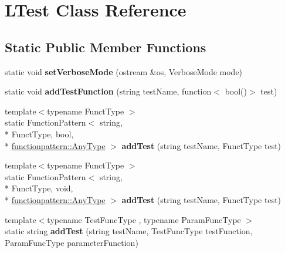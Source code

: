 \hypertarget{class_l_test}{\section{L\-Test Class Reference}
\label{class_l_test}
}
\subsection*{Static Public Member Functions}
\begin{DoxyCompactItemize}
\item 
\hypertarget{class_l_test_af5b3eae6c08705345a7b62f42e500af6}{static void {\bfseries set\-Verbose\-Mode} (ostream \&os, Verbose\-Mode mode)}\label{class_l_test_af5b3eae6c08705345a7b62f42e500af6}

\item 
\hypertarget{class_l_test_acec66e13084163dc332fa8625fea15ad}{static void {\bfseries add\-Test\-Function} (string test\-Name, function$<$ bool()$>$ test)}\label{class_l_test_acec66e13084163dc332fa8625fea15ad}

\item 
\hypertarget{class_l_test_ab407d3a24f5cb9736b892bcaf7063a3c}{{\footnotesize template$<$typename Funct\-Type $>$ }\\static Function\-Pattern$<$ string, \\*
Funct\-Type, bool, \\*
\hyperlink{structfunctionpattern_1_1_any_type}{functionpattern\-::\-Any\-Type} $>$ {\bfseries add\-Test} (string test\-Name, Funct\-Type test)}\label{class_l_test_ab407d3a24f5cb9736b892bcaf7063a3c}

\item 
\hypertarget{class_l_test_a99285262a01ef68ca4c6e1c1f3c558a3}{{\footnotesize template$<$typename Funct\-Type $>$ }\\static Function\-Pattern$<$ string, \\*
Funct\-Type, void, \\*
\hyperlink{structfunctionpattern_1_1_any_type}{functionpattern\-::\-Any\-Type} $>$ {\bfseries add\-Test} (string test\-Name, Funct\-Type test)}\label{class_l_test_a99285262a01ef68ca4c6e1c1f3c558a3}

\item 
\hypertarget{class_l_test_a414d784ce0ba99b010ab97bc34a7d762}{{\footnotesize template$<$typename Test\-Func\-Type , typename Param\-Func\-Type $>$ }\\static string {\bfseries add\-Test} (string test\-Name, Test\-Func\-Type test\-Function, Param\-Func\-Type parameter\-Function)}\label{class_l_test_a414d784ce0ba99b010ab97bc34a7d762}


\end{DoxyCompactItemize}
